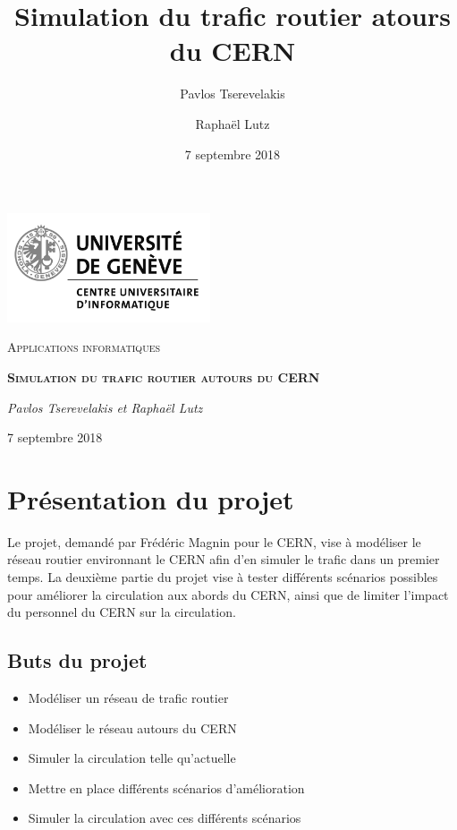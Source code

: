 \documentclass[a4paper,11pt, titlepage]{extarticle}
\title{Simulation du trafic routier atours du CERN}
\author{Pavlos Tserevelakis \and Raphaël Lutz}
\date{7 septembre 2018}
\begin{document}
\begin{titlepage}
	\centering
	\includegraphics[width=0.45\textwidth]{logoUni.jpg}\par
	\vspace{3cm}
	{\scshape\Large Applications informatiques \par}
	\vspace{1.5cm}
	{\scshape\huge\bfseries Simulation du trafic routier autours du CERN\par}
	\vspace{1.5cm}
	{\Large\itshape Pavlos Tserevelakis et Raphaël Lutz\par}
	\vspace{1.5cm}
	{ 7 septembre 2018\par}
	\vfill
\end{titlepage}


\tableofcontents\newpage

\pagestyle{fancy}
\renewcommand{\headheight}{24pt}

\section{Présentation du projet}

Le projet, demandé par Frédéric Magnin pour le CERN, vise à modéliser le réseau routier environnant le CERN afin d'en simuler le trafic dans un premier temps. La deuxième partie du projet vise à tester différents scénarios possibles pour améliorer la circulation aux abords du CERN, ainsi que de limiter l'impact du personnel du CERN sur la circulation.

\subsection{Buts du projet}

\begin{itemize}
\item Modéliser un réseau de trafic routier
\item Modéliser le réseau autours du CERN
\item Simuler la circulation telle qu'actuelle
\item Mettre en place différents scénarios d'amélioration
\item Simuler la circulation avec ces différents scénarios
\end{itemize}
\end{document}
